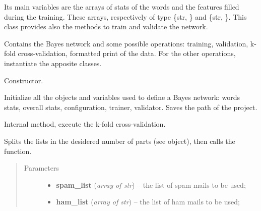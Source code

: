 \documentclass[letterpaper,10pt,english]{sphinxmanual}
\begin{document}
Its main variables are the arrays of stats of the words and the features filled during the training. These arrays, respectively of type \{str, {\hyperref[index:gen_stat.Word]{}}\} and \{str, {\hyperref[index:gen_stat.Stat]{}}\}. This class provides also the methods to train and validate the network.
\label{index:module-naive_bayes}

\begin{fulllineitems}
\label{index:naive_bayes.Bayes}
Contains the Bayes network and some possible operations: training,
validation, k-fold cross-validation, formatted print of the data.
For the other operations, instantiate the apposite classes.

\begin{fulllineitems}
\label{index:naive_bayes.Bayes.__init__}
Constructor.

Initialize all the objects and variables used to define a Bayes network:
words stats, overall stats, configuration, trainer, validator.
Saves the path of the project.

\end{fulllineitems}


\begin{fulllineitems}
\label{index:naive_bayes.Bayes._k_fold_cross_validation}
Internal method, execute the k-fold cross-validation.

Splits the lists in the desidered number of parts
(see {\hyperref[index:config.Config]{}} object),
then calls the {\hyperref[index:trainer.Trainer.train]{}} function.
\begin{quote}\begin{description}
\item[{Parameters}] \leavevmode\begin{itemize}
\item {} 
\textbf{spam\_list} (\emph{array of str}) -- the list of spam mails to be used;

\item {} 
\textbf{ham\_list} (\emph{array of str}) -- the list of ham mails to be used;


\end{itemize}
\end{description}
\end{quote}
\end{fulllineitems}
\end{fulllineitems}
\end{document}
